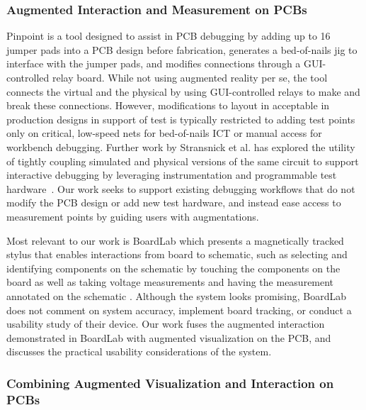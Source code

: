 \documentclass [11pt, proquest] {uwthesis}[2020/02/24]
\begin{document}
\subsubsection{Augmented Interaction and Measurement on PCBs}
Pinpoint \cite{Strasnick2019Pinpoint} is a tool designed to assist in PCB debugging by adding up to 16 jumper pads into a PCB design before fabrication, generates a bed-of-nails jig to interface with the jumper pads, and modifies connections through a GUI-controlled relay board. While not using augmented reality per se, the tool connects the virtual and the physical by using GUI-controlled relays to make and break these connections. However, modifications to layout in acceptable in production designs in support of test is typically restricted to adding test points only on critical, low-speed nets for bed-of-nails ICT or manual access for workbench debugging. Further work by Stransnick et al. has  explored the utility of tightly coupling simulated and physical versions of the same circuit to support interactive debugging by leveraging instrumentation and programmable test hardware~\cite{Strasnick2021CouplingDebugging}. Our work seeks to support existing debugging workflows that do not modify the PCB design or add new test hardware, and instead ease access to measurement points by guiding users with augmentations.

Most relevant to our work is BoardLab which presents a magnetically tracked stylus that enables interactions from board to schematic, such as selecting and identifying components on the schematic by touching the components on the board as well as taking voltage measurements and having the measurement annotated on the schematic \cite{Goyal2013BoardLab}.
{Although the system looks promising, BoardLab does not comment on system accuracy, implement board tracking, or conduct a usability study of their device.}
{Our work fuses the augmented interaction demonstrated in BoardLab with augmented visualization on the PCB, and discusses the practical usability considerations of the system.} 

\subsubsection{{Combining Augmented Visualization and Interaction on PCBs}}
\end{document}
